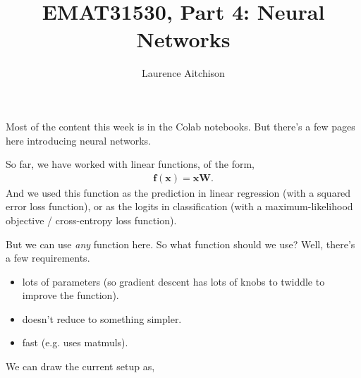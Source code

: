 \documentclass{article}
\title{EMAT31530, Part 4: Neural Networks}
\author{Laurence Aitchison}
\date{}
\newcommand{\x}{\mathbf{x}}
\newcommand{\y}{\mathbf{y}}
\newcommand{\f}{\mathbf{f}}
\newcommand{\W}{\mathbf{W}}
\begin{document}
\maketitle

Most of the content this week is in the Colab notebooks.  But there's a few pages here introducing neural networks.

So far, we have worked with linear functions, of the form,
\begin{align}
  \f(\x) = \x\W.
\end{align}
And we used this function as the prediction in linear regression (with a squared error loss function), or as the logits in classification (with a maximum-likelihood objective / cross-entropy loss function).

But we can use \textit{any} function here.
So what function should we use?
Well, there's a few requirements.
\begin{itemize}
  \item lots of parameters (so gradient descent has lots of knobs to twiddle to improve the function).      
  \item doesn't reduce to something simpler.
  \item fast (e.g. uses matmuls).
\end{itemize}

We can draw the current setup as,

\begin{center}
\end{center}
\end{document}

